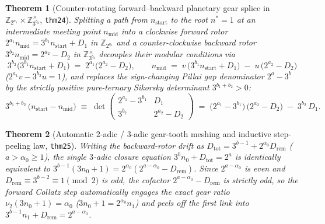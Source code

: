 \documentclass[11pt,a4paper]{article}
\newtheorem{theorem}{Theorem}[section]
\theoremstyle{definition}
\theoremstyle{remark}
\begin{document}
\begin{theorem}[Counter-rotating forward--backward planetary gear splice in $\mathbb{Z}_{2^{a_1}} \times \mathbb{Z}_{3^{b_2}}^\times$, \texttt{thm24}]
\label{thm:counter-rotating-splice}
Splitting a path from $n_{\mathrm{start}}$ to the root $n^* = 1$ at an intermediate meeting point $n_{\mathrm{mid}}$ into a clockwise forward rotor $2^{a_1} n_{\mathrm{mid}} = 3^{b_1} n_{\mathrm{start}} + D_1$ in $\mathbb{Z}_{2^{a_1}}$ and a counter-clockwise backward rotor $3^{b_2} n_{\mathrm{mid}} = 2^{a_2} - D_2$ in $\mathbb{Z}_{3^{b_2}}^\times$ decouples their modular conditions via
\begin{equation}
  \label{eq:counter-rotating-splice}
  3^{b_2}\bigl(3^{b_1} n_{\mathrm{start}} + D_1\bigr) \;=\; 2^{a_1}\bigl(2^{a_2} - D_2\bigr), \qquad
  n_{\mathrm{mid}} \;=\; v\,\bigl(3^{b_1} n_{\mathrm{start}} + D_1\bigr) \;-\; u\,\bigl(2^{a_2} - D_2\bigr)
\end{equation}
($2^{a_1} v - 3^{b_2} u = 1$), and replaces the sign-changing Pillai gap denominator $2^a - 3^b$ by the strictly positive pure-ternary Sikorsky determinant $3^{b_1 + b_2} > 0$:
\begin{equation}
  \label{eq:pure-ternary-chord-law}
  3^{b_1 + b_2}\,\bigl(n_{\mathrm{start}} - n_{\mathrm{mid}}\bigr) \;\equiv\; \det\begin{pmatrix} 2^{a_1} - 3^{b_1} & D_1 \\ 3^{b_2} & 2^{a_2} - D_2 \end{pmatrix} \;=\; \bigl(2^{a_1} - 3^{b_1}\bigr)\,\bigl(2^{a_2} - D_2\bigr) \;-\; 3^{b_2}\,D_1.
\end{equation}
\end{theorem}

\begin{theorem}[Automatic $2$-adic / $3$-adic gear-tooth meshing and inductive step-peeling law, \texttt{thm25}]
\label{thm:gear-tooth-meshing}
Writing the backward-rotor drift as $D_{\mathrm{tot}} = 3^{b-1} + 2^{\alpha_0} D_{\mathrm{rem}}$ ($a > \alpha_0 \ge 1$), the single $3$-adic closure equation $3^b n_0 + D_{\mathrm{tot}} = 2^a$ is identically equivalent to $3^{b-1}(3 n_0 + 1) = 2^{\alpha_0}(2^{a - \alpha_0} - D_{\mathrm{rem}})$. Since $2^{a - \alpha_0}$ is even and $D_{\mathrm{rem}} \equiv 3^{b-2} \equiv 1 \pmod 2$ is odd, the cofactor $2^{a - \alpha_0} - D_{\mathrm{rem}}$ is strictly odd, so the forward Collatz step automatically engages the exact gear ratio $\nu_2(3 n_0 + 1) = \alpha_0$ ($3 n_0 + 1 = 2^{\alpha_0} n_1$) and peels off the first link into $3^{b-1} n_1 + D_{\mathrm{rem}} = 2^{a - \alpha_0}$.
\end{theorem}
\end{document}
